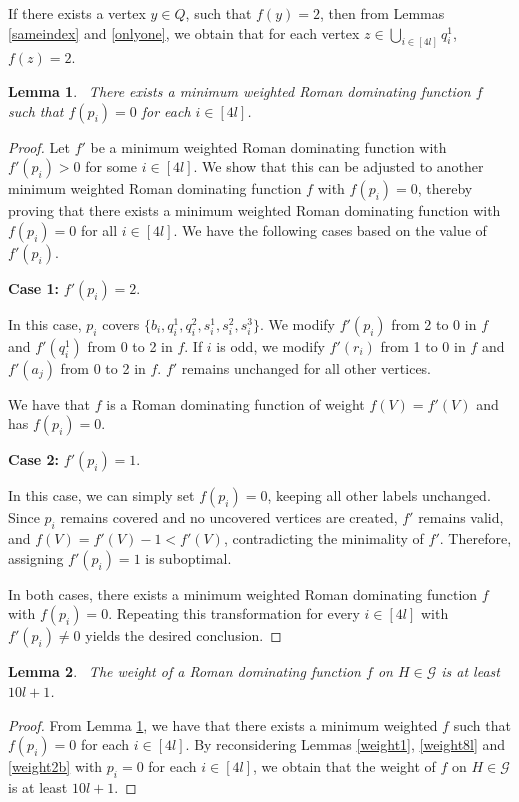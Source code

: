 \documentclass[preprint,12pt]{elsarticle}
\newtheorem{lemma}{Lemma}
\begin{document}
If there exists a vertex $y \in Q$, such that $f(y) =2$, then from Lemmas \ref{sameindex} and \ref{onlyone}, we obtain that for each vertex $z \in \bigcup\limits_{i \in [4l]} {q_i^1}$, $f(z) = 2$.
\begin{lemma}~\label{nopvertex}
    There exists a minimum weighted Roman dominating function $f$ such that $f(p_i) = 0$ for each $i \in [4l]$.
\end{lemma}
\begin{proof}
Let $f'$ be a minimum weighted Roman dominating function with $f'(p_i) > 0$ for some $i \in [4l]$. We show that this can be adjusted to another minimum weighted Roman dominating function $f$ with $f(p_i) = 0$, thereby proving that there exists a minimum weighted Roman dominating function with $f(p_i) = 0$ for all $i \in [4l]$. We have the following cases based on the value of $f'(p_i)$.

\medskip\noindent
\textbf{Case 1:} $f'(p_i) = 2$.

In this case, $p_i$ covers $\{b_i, q_i^1, q_i^2, s_i^1, s_i^2, s_i^3\}$. We modify $f'(p_i)$ from 2 to 0 in $f$ and $f'(q_i^1)$ from 0 to 2 in $f$. If $i$ is odd, we modify $f'(r_i)$ from 1 to 0 in $f$ and $f'(a_j)$ from 0 to 2 in $f$. $f'$ remains unchanged for all other vertices.

We have that $f$ is a Roman dominating function of weight $f(V) = f'(V)$ and has $f(p_i) = 0$.

\medskip\noindent
\textbf{Case 2:} $f'(p_i) = 1$.

In this case, we can simply set $f(p_i) = 0$, keeping all other labels unchanged. Since $p_i$ remains covered and no uncovered vertices are created, $f'$ remains valid, and 
$f(V) = f'(V) - 1 < f'(V)$,
contradicting the minimality of $f'$. Therefore, assigning $f'(p_i) = 1$ is suboptimal.

In both cases, there exists a minimum weighted Roman dominating function $f$ with $f(p_i) = 0$. Repeating this transformation for every $i \in [4l]$ with $f'(p_i) \neq 0$ yields the desired conclusion.


\end{proof}
\begin{lemma}~\label{weight10l}
    The weight of a Roman dominating function $f$ on $H \in \mathcal{G}$ is at least $10l+1$.
\end{lemma}
\begin{proof}
From Lemma \ref{nopvertex}, we have that there exists a minimum weighted $f$ such that $f(p_i) = 0$ for each $i \in [4l]$. By reconsidering Lemmas \ref{weight1}, \ref{weight8l} and \ref{weight2b} with $p_i = 0$ for each $i \in [4l]$, we obtain that the weight of $f$ on $H \in \mathcal{G}$ is at least $10l+1$. 
\end{proof}
\end{document}
